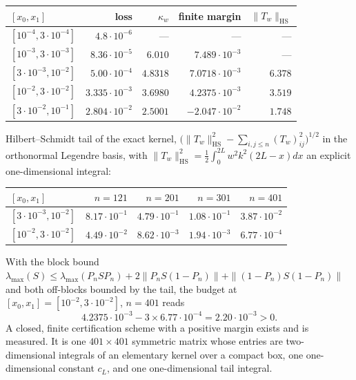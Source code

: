 \documentclass[11pt]{article}
\theoremstyle{remark}
\begin{document}
\begin{center}
\small
\begin{tabular}{@{}lrrrr@{}}
\toprule
$[x_0,x_1]$ & loss & $\kappa_w$ & finite margin
  & $\|T_w\|_{\mathrm{HS}}$ \\
\midrule
$[10^{-4},3\cdot10^{-4}]$ & $4.8\cdot10^{-6}$ & --- & --- & --- \\
$[10^{-3},3\cdot10^{-3}]$ & $8.36\cdot10^{-5}$ & $6.010$
  & $7.489\cdot10^{-3}$ & --- \\
$[3\cdot10^{-3},10^{-2}]$ & $5.00\cdot10^{-4}$ & $4.8318$
  & $7.0718\cdot10^{-3}$ & $6.378$ \\
$[10^{-2},3\cdot10^{-2}]$ & $3.335\cdot10^{-3}$ & $3.6980$
  & $4.2375\cdot10^{-3}$ & $3.519$ \\
$[3\cdot10^{-2},10^{-1}]$ & $2.804\cdot10^{-2}$ & $2.5001$
  & $-2.047\cdot10^{-2}$ & $1.748$ \\
\bottomrule
\end{tabular}
\end{center}

Hilbert--Schmidt tail of the exact kernel,
$\big(\|T_w\|^2_{\mathrm{HS}}-\sum_{i,j\le n}(T_w)_{ij}^2\big)^{1/2}$
in the orthonormal Legendre basis, with
$\|T_w\|^2_{\mathrm{HS}}=\tfrac12\int_0^{2L}w^2k^2(2L-x)dx$
an explicit one-dimensional integral:

\begin{center}
\small
\begin{tabular}{@{}lrrrr@{}}
\toprule
$[x_0,x_1]$ & $n=121$ & $n=201$ & $n=301$ & $n=401$ \\
\midrule
$[3\cdot10^{-3},10^{-2}]$
  & $8.17\cdot10^{-1}$ & $4.79\cdot10^{-1}$
  & $1.08\cdot10^{-1}$ & $3.87\cdot10^{-2}$ \\
$[10^{-2},3\cdot10^{-2}]$
  & $4.49\cdot10^{-2}$ & $8.62\cdot10^{-3}$
  & $1.94\cdot10^{-3}$ & $6.77\cdot10^{-4}$ \\
\bottomrule
\end{tabular}
\end{center}

With the block bound
$\lambda_{\max}(S)\le\lambda_{\max}(P_nSP_n)
+2\|P_nS(1-P_n)\|+\|(1-P_n)S(1-P_n)\|$
and both off-blocks bounded by the tail, the budget at
$[x_0,x_1]=[10^{-2},3\cdot10^{-2}]$, $n=401$ reads
\[
  4.2375\cdot10^{-3}-3\times6.77\cdot10^{-4}
  =2.20\cdot10^{-3}>0 .
\]
A closed, finite certification scheme with a positive margin
exists and is measured.  It is one $401\times401$ symmetric
matrix whose entries are two-dimensional integrals of an
elementary kernel over a compact box, one one-dimensional
constant $c_L$, and one one-dimensional tail integral.
\end{document}
